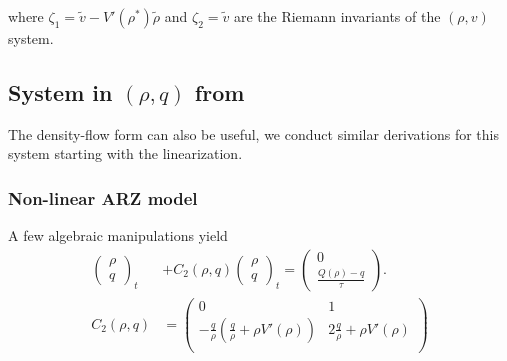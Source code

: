 \documentclass[a4paper, 10pt, conference]{ieeeconf}      %
\begin{document}
where
{\footnotesize
$\zeta_1 = \tilde{v} - V'( \rho^* )\tilde{\rho}$ and $\zeta_2 = \tilde{v}$
}
are the Riemann invariants of the $(\rho, v)$ system.


\subsection{System in $(\rho, q)$ from}
The density-flow form can also be useful, we conduct similar derivations for this system starting with the linearization.

\subsubsection{Non-linear ARZ model}
A few algebraic manipulations yield
{\footnotesize
\begin{subequations}
\begin{align}
\begin{pmatrix}
	\rho \\
	q
\end{pmatrix}_t 
&+
C_2\left(\rho, q\right)
\begin{pmatrix}
	\rho \\ 
	q
\end{pmatrix}_t
=
\begin{pmatrix}
	0 \\ 
	\frac{Q(\rho) - q}{\tau}
\end{pmatrix}. \label{ARZrhoq} \\
C_2 \left(\rho, q \right)
&= 
\begin{pmatrix}
	0 & 1 \\
	- \frac{q}{\rho} \left( \frac{q}{\rho} + \rho V'\left( \rho \right) \right) & 2 \frac{q}{\rho} + \rho V'\left( \rho \right) \\
\end{pmatrix}
\end{align}
\end{subequations}
}
\end{document}
